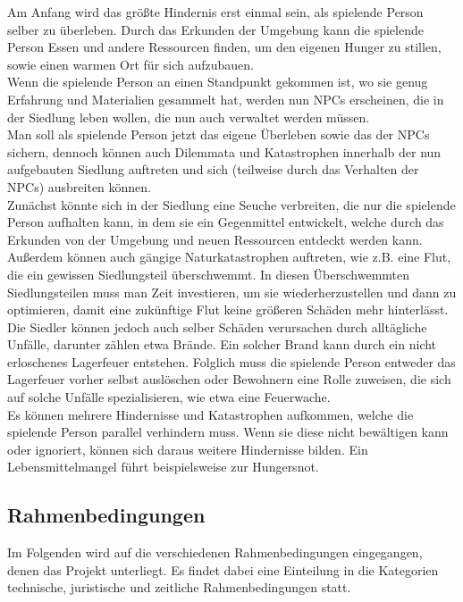 \documentclass[paper=A4,pagesize=auto,12pt,headinclude=true,footinclude=true,BCOR=0mm,DIV=calc]{scrartcl}
\newcommand{\sectionspace}{
	\vspace{0.5cm}
}
\begin{document}
Am Anfang wird das größte Hindernis erst einmal sein, als spielende Person selber zu überleben.
Durch das Erkunden der Umgebung kann die spielende Person Essen und andere Ressourcen finden, um den eigenen Hunger zu stillen, sowie einen warmen Ort für sich aufzubauen.\\
Wenn die spielende Person an einen Standpunkt gekommen ist, wo sie genug Erfahrung und Materialien gesammelt hat, werden nun NPCs erscheinen, die in der Siedlung leben wollen, die nun auch verwaltet werden müssen.\\
Man soll als spielende Person jetzt das eigene Überleben sowie das der NPCs sichern, dennoch können auch Dilemmata und Katastrophen innerhalb der nun aufgebauten Siedlung auftreten und sich (teilweise durch das Verhalten der NPCs) ausbreiten können.\\
Zunächst könnte sich in der Siedlung eine Seuche verbreiten, die nur die spielende Person aufhalten kann, in dem sie ein Gegenmittel entwickelt, welche durch das Erkunden von der Umgebung und neuen Ressourcen entdeckt werden kann.\\
Außerdem können auch gängige Naturkatastrophen auftreten, wie z.B. eine Flut, die ein gewissen Siedlungsteil überschwemmt. In diesen Überschwemmten Siedlungsteilen muss man Zeit investieren, um sie wiederherzustellen und dann zu optimieren, damit eine zukünftige Flut keine größeren Schäden mehr hinterlässt.\\
Die Siedler können jedoch auch selber Schäden verursachen durch alltägliche Unfälle, darunter zählen etwa Brände. Ein solcher Brand kann durch ein nicht erloschenes Lagerfeuer entstehen. Folglich muss die spielende Person entweder das Lagerfeuer vorher selbst auslöschen oder Bewohnern eine Rolle zuweisen, die sich auf solche Unfälle spezialisieren, wie etwa eine Feuerwache. \\
Es können mehrere Hindernisse und Katastrophen aufkommen, welche die spielende Person parallel verhindern muss. Wenn sie diese nicht bewältigen kann oder ignoriert, können sich daraus weitere Hindernisse bilden. Ein Lebensmittelmangel führt beispielsweise zur Hungersnot.

\sectionspace
\subsection{Rahmenbedingungen}\label{sec:Rahmenbedingungen}
Im Folgenden wird auf die verschiedenen Rahmenbedingungen eingegangen, denen das Projekt unterliegt. Es findet dabei eine Einteilung in die Kategorien technische, juristische und zeitliche Rahmenbedingungen statt. %
\end{document}
